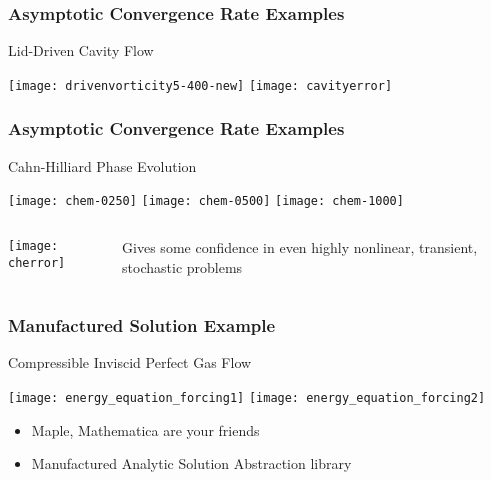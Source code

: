 \begin{frame}
\frametitle{Asymptotic Convergence Rate Examples}
\begin{block}{Lid-Driven Cavity Flow}
\begin{center}
\texttt{[image: drivenvorticity5-400-new]}
\;\;\;
\texttt{[image: cavityerror]}
\end{center}
\end{block}

\end{frame}

\begin{frame}
\frametitle{Asymptotic Convergence Rate Examples}
\begin{block}{Cahn-Hilliard Phase Evolution}
\begin{center}
\texttt{[image: chem-0250]}
\;\;\;
\texttt{[image: chem-0500]}
\;\;\;
\texttt{[image: chem-1000]}
\end{center}
\end{block}

\begin{columns}
\begin{column}{.4\textwidth}
\begin{center}
\texttt{[image: cherror]}
\end{center}
\end{column}
\begin{column}{.6\textwidth}
Gives some confidence in even highly nonlinear, transient, stochastic problems
\end{column}
\end{columns}

\end{frame}

\begin{frame}
\frametitle{Manufactured Solution Example}
\begin{block}{Compressible Inviscid Perfect Gas Flow}

\texttt{[image: energy\_equation\_forcing1]}
\texttt{[image: energy\_equation\_forcing2]}

\end{block}

\begin{itemize}
\item Maple, Mathematica are your friends
\item Manufactured Analytic Solution Abstraction library
\end{itemize}

\end{frame}
